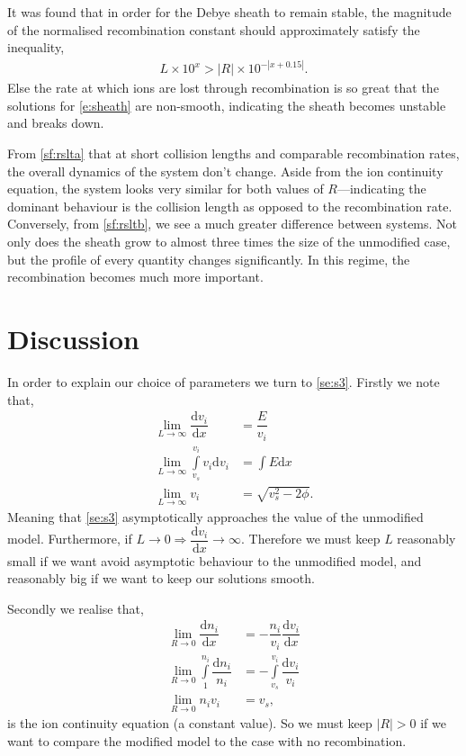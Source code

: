 \documentclass[aip,apl,reprint]{revtex4-1}
\newcommand{\difx}[1]{\dfrac{\mathrm{d}#1}{\mathrm{d}x}}
\begin{document}
	It was found that in order for the Debye sheath to remain stable, the magnitude of the normalised recombination constant should approximately satisfy the inequality,
	\begin{align}
		L \times 10^{x} > |R| \times 10^{-|x+0.15|}.\label{e:rl}
	\end{align}
	Else the rate at which ions are lost through recombination is so great that the solutions for \cref{e:sheath} are non-smooth, indicating the sheath becomes unstable and breaks down.
	
	From \cref{sf:rslta} that at short collision lengths and comparable recombination rates, the overall dynamics of the system don't change. Aside from the ion continuity equation, the system looks very similar for both values of $R$---indicating the dominant behaviour is the collision length as opposed to the recombination rate. Conversely, from \cref{sf:rsltb}, we see a much greater difference between systems. Not only does the sheath grow to almost three times the size of the unmodified case, but the profile of every quantity changes significantly. In this regime, the recombination becomes much more important. 
	
	\section{Discussion}\label{s:discussion}
	In order to explain our choice of parameters we turn to \cref{se:s3}. Firstly we note that,
	\begin{subequations}
		\begin{align}
			\lim\limits_{L \to \infty} \difx{v_{i}} &= \dfrac{E}{v_{i}}\\
			\lim\limits_{L \to \infty} \int\limits_{v_{s}}^{v_{i}} v_{i} \mathrm{d}v_{i} &= \int E \mathrm{d}x\\
			\lim\limits_{L \to \infty} v_{i} &= \sqrt{v_{s}^{2} - 2\phi}.\label{se:vi}
		\end{align}
	\end{subequations}
	Meaning that \cref{se:s3} asymptotically approaches the value of the unmodified model. Furthermore, if $L \to 0 \Rightarrow \difx{v_{i}} \to \infty$. Therefore we must keep $L$ reasonably small if we want avoid asymptotic behaviour to the unmodified model, and reasonably big if we want to keep our solutions smooth.
	
	Secondly we realise that,
	\begin{subequations}
		\begin{align}
			\lim\limits_{R \to 0} \difx{n_{i}} &= -\dfrac{n_{i}}{v_{i}} \difx{v_{i}} \\
			\lim\limits_{R \to 0} \int\limits_{1}^{n_{i}}\dfrac{\mathrm{d} n_{i}}{n_{i}} &= -\int\limits_{v_{s}}^{v_{i}}\dfrac{\mathrm{d} v_{i}}{v_{i}}\\
			\lim\limits_{R \to 0} n_{i}v_{i} &= v_{s},
		\end{align}
	\end{subequations}
	is the ion continuity equation (a constant value). So we must keep $|R| > 0$ if we want to compare the modified model to the case with no recombination. 
	
\end{document}
